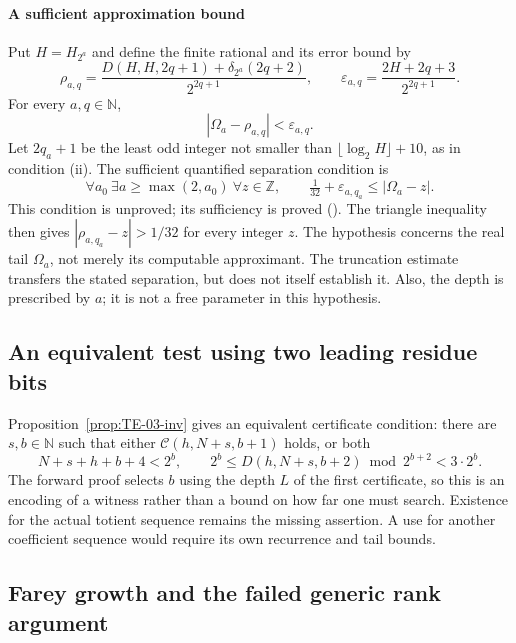 \paragraph{A sufficient approximation bound}
Put $H=H_{2^a}$ and define the finite rational and its error bound by
\[
 \rho_{a,q}=
 \frac{D(H,H,2q+1)+\delta_{2^a}(2q+2)}{2^{2q+1}},\qquad
 \varepsilon_{a,q}=\frac{2H+2q+3}{2^{2q+1}}.
\]
For every $a,q\in\mathbb N$,
\[
 |\Omega_a-\rho_{a,q}|<\varepsilon_{a,q}.
\]
Let $2q_a+1$ be the least odd integer not smaller than
$\lfloor\log_2H\rfloor+10$, as in condition (ii). The sufficient
quantified separation condition is
\[
 \forall a_0\ \exists a\ge\max(2,a_0)\ \forall z\in\mathbb Z,
 \qquad \tfrac1{32}+\varepsilon_{a,q_a}\le|\Omega_a-z|.
\]
This condition is unproved; its sufficiency is proved
().
The triangle inequality then gives
$|\rho_{a,q_a}-z|>1/32$ for every integer $z$.
The hypothesis concerns the real tail $\Omega_a$, not merely its
computable approximant. The truncation estimate transfers the stated
separation, but does not itself establish it. Also, the depth is
prescribed by $a$; it is not a free parameter in this hypothesis.

\subsection{An equivalent test using two leading residue bits}

Proposition~\ref{prop:TE-03-inv} gives an equivalent certificate
condition: there are $s,b\in\mathbb N$ such that either
$\mathcal C(h,N+s,b+1)$ holds, or both
\[
 N+s+h+b+4<2^b,\qquad
 2^b\le D(h,N+s,b+2)\bmod2^{b+2}<3\cdot2^b.
\]
The forward proof selects $b$ using the depth $L$ of the first
certificate, so this is an encoding of a witness rather than a bound
on how far one must search. Existence for the actual totient sequence
remains the missing assertion. A use for another coefficient sequence
would require its own recurrence and tail bounds.

\subsection{Farey growth and the failed generic rank argument}


